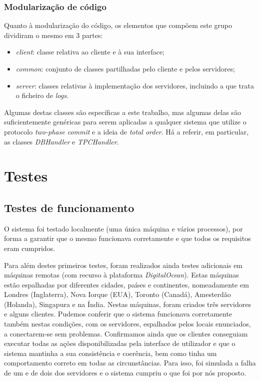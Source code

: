 \documentclass[a4paper]{report}
\begin{document}
		\subsection{Modularização de código}
		
		Quanto à modularização do código, os elementos que compõem este grupo dividiram o mesmo em 3 partes:
		\begin{itemize}
			\item \textit{client}: classe relativa ao cliente e à sua interface;
			\item \textit{common}: conjunto de classes partilhadas pelo cliente e pelos servidores;
			\item \textit{server}: classes relativas à implementação dos servidores, incluindo a que trata o ficheiro de \textit{logs}.
		\end{itemize}
		Algumas destas classes são específicas a este trabalho, mas algumas delas são suficientemente genéricas para serem aplicadas a qualquer sistema que utilize o protocolo \textit{two-phase commit} e a ideia de \textit{total order}. Há a referir, em particular, as classes \textit{DBHandler} e \textit{TPCHandler}.

\chapter{Testes}
	\section{Testes de funcionamento}
		O sistema foi testado localmente (uma única máquina e vários processos), por forma a garantir que o mesmo funcionava corretamente e que todos os requisitos eram cumpridos.

		Para além destes primeiros testes, foram realizados ainda testes adicionais em máquinas remotas (com recurso à plataforma \textit{DigitalOcean}). Estas máquinas estão espalhadas por diferentes cidades, países e continentes, 
		nomeadamente em Londres (Inglaterra), Nova Iorque (EUA), Toronto (Canadá), Amesterdão (Holanda), Singapura e na Índia.
		Nestas máquinas, foram criados três servidores e alguns clientes. 
		Pudemos conferir que o sistema funcionava corretamente também nestas condições, com os servidores, espalhados pelos locais enunciados, a conectarem-se sem problemas.
		Confirmamos ainda que os clientes conseguiam executar todas as ações disponibilizadas pela interface de utilizador e que o sistema mantinha a sua consistência e coerência, 
		bem como tinha um comportamento correto em todas as circunstâncias. Para isso, foi simulada a falha de um e de dois dos servidores e o sistema cumpriu o que foi por nós proposto.
\end{document}
